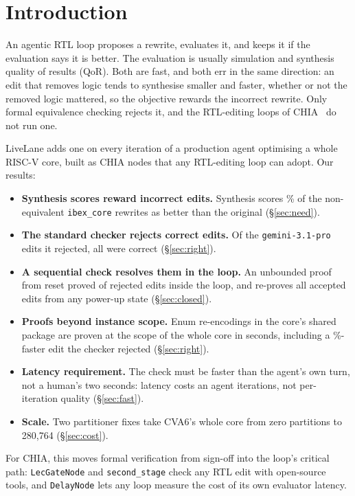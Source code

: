 \documentclass[sigconf,nonacm]{acmart}
\begin{document}
\section{Introduction}

An agentic RTL loop proposes a rewrite, evaluates it, and keeps it if the
evaluation says it is better. The evaluation is usually simulation and synthesis
quality of results (QoR). Both are fast, and both err in the same direction: an
edit that removes logic tends to synthesise smaller and faster, whether or not
the removed logic mattered, so the objective rewards the incorrect rewrite.
Only formal equivalence checking rejects it, and the
RTL-editing loops of CHIA~\cite{chia} do not run one.

LiveLane adds one on every iteration of a production agent optimising a whole
RISC-V core, built as CHIA nodes that any RTL-editing loop can adopt. Our
results:

\begin{itemize}\setlength{\itemsep}{1pt}\setlength{\parskip}{0pt}
\item \textbf{Synthesis scores reward incorrect edits.} Synthesis scores
\RWconfEitherPct\% of the non-equivalent \texttt{ibex\_core} rewrites as better
than the original (\S\ref{sec:need}).
\item \textbf{The standard checker rejects correct edits.} Of the
\ABctlRefused{} \texttt{gemini-3.1-pro} edits it rejected, all \ABctlFalse{}
were correct (\S\ref{sec:right}).
\item \textbf{A sequential check resolves them in the loop.} An unbounded proof
from reset proved \ABscTold{} of \ABscRefused{} rejected edits inside the
loop\ABscRest{}, and re-proves all \ABacc{} accepted edits from any power-up
state (\S\ref{sec:closed}).
\item \textbf{Proofs beyond instance scope.} Enum re-encodings in the core's
shared package are proven at the scope of the whole core in seconds, including
a \PKGbestPct\%-faster edit the checker rejected (\S\ref{sec:right}).
\item \textbf{Latency requirement.} The check must be faster than the agent's
own turn, not a human's two seconds: latency costs an agent iterations, not
per-iteration quality (\S\ref{sec:fast}).
\item \textbf{Scale.} Two partitioner fixes take CVA6's whole core from zero
partitions to 280{,}764 (\S\ref{sec:cost}).
\end{itemize}
For CHIA, this moves formal verification from sign-off into the loop's critical
path: \texttt{LecGateNode} and \texttt{second\_stage} check any RTL edit with
open-source tools, and \texttt{DelayNode} lets any loop measure the cost of its
own evaluator latency.
\end{document}
